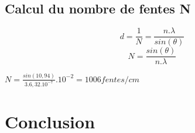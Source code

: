 \documentclass[11pt,a4paper]{report}
\begin{document}
	\subsection{Calcul du nombre de fentes N}
	\begin{equation}
	d = \frac{1}{N} = \frac{n.\lambda}{sin(\theta)}
	\end{equation}
	\begin{equation}
	N =  \frac{sin(\theta)}{n.\lambda}
	\end{equation}
\begin{center}
	$N =  \frac{sin(10,94)}{3.6,32.10^{-7}} . 10^{-2} = 1006 fentes/cm$
	\end{center}
	\section{Conclusion}
\end{document}
